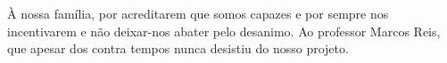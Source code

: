À nossa família, por acreditarem que somos capazes e por sempre nos incentivarem e não deixar-nos abater pelo desanimo. Ao professor Marcos Reis, que apesar dos contra tempos nunca desistiu do nosso projeto.